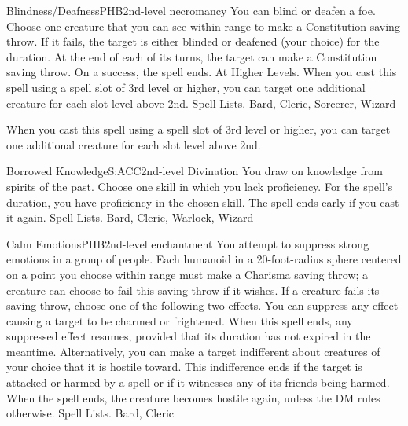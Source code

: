 \begin{spell}{Blindness/Deafness}{PHB}{2nd-level necromancy}
{
}
You can blind or deafen a foe. Choose one creature that you can see within range to make a Constitution saving throw. If it fails, the target is either blinded or deafened (your choice) for the duration. At the end of each of its turns, the target can make a Constitution saving throw. On a success, the spell ends.
At Higher Levels. When you cast this spell using a spell slot of 3rd level or higher, you can target one additional creature for each slot level above 2nd.
Spell Lists. Bard, Cleric, Sorcerer, Wizard

 When you cast this spell using a spell slot of 3rd level or higher, you can target one additional creature for each slot level above 2nd.
\end{spell}

\begin{spell}{Borrowed Knowledge}{S:ACC}{2nd-level Divination}
{
}
You draw on knowledge from spirits of the past. Choose one skill in which you lack proficiency. For the spell's duration, you have proficiency in the chosen skill. The spell ends early if you cast it again.
Spell Lists. Bard, Cleric, Warlock, Wizard
\end{spell}

\begin{spell}{Calm Emotions}{PHB}{2nd-level enchantment}
{
}
You attempt to suppress strong emotions in a group of people. Each humanoid in a 20-foot-radius sphere centered on a point you choose within range must make a Charisma saving throw; a creature can choose to fail this saving throw if it wishes. If a creature fails its saving throw, choose one of the following two effects. You can suppress any effect causing a target to be charmed or frightened. When this spell ends, any suppressed effect resumes, provided that its duration has not expired in the meantime.
Alternatively, you can make a target indifferent about creatures of your choice that it is hostile toward. This indifference ends if the target is attacked or harmed by a spell or if it witnesses any of its friends being harmed. When the spell ends, the creature becomes hostile again, unless the DM rules otherwise.
Spell Lists. Bard, Cleric
\end{spell}


